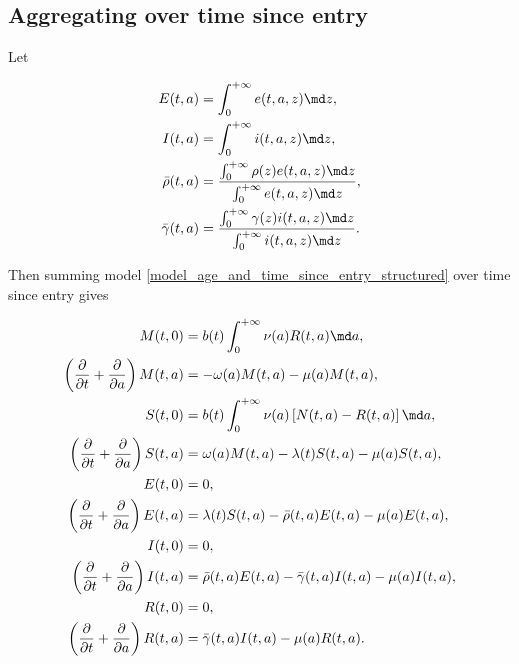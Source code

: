 \documentclass{jpmarticle}
\let\subequationsorig\subequations%
\let\endsubequationsorig\endsubequations%
\renewenvironment{subequations}{
  \subequationsorig
  \renewcommand{\theequation}{\theparentequation.\arabic{equation}}
}{
  \endsubequationsorig
}
\begin{document}
\subsection{Aggregating over time since entry}

Let
\begin{subequations}
  \begin{align}
    E(t, a)
    &= \int_0^{+\infty} e(t, a, z) \md z,
    \\
    I(t, a)
    &= \int_0^{+\infty} i(t, a, z) \md z,
    \\
    \bar{\rho}(t, a)
    &= \frac{\int_0^{+\infty} \rho(z) e(t, a, z) \md z}
      {\int_0^{+\infty} e(t, a, z) \md z},
    \\
    \bar{\gamma}(t, a)
    &= \frac{\int_0^{+\infty} \gamma(z) i(t, a, z) \md z}
      {\int_0^{+\infty} i(t, a, z) \md z}.
  \end{align}
\end{subequations}
Then summing model \eqref{model_age_and_time_since_entry_structured}
over time since entry gives
\begin{subequations}
  \label{model_age_and_time_since_entry_structured_agg_tse}
  \begin{align}
    M(t, 0) &=
    b(t) \int_0^{+\infty} \nu(a) R(t, a) \md a,
    \\
    \left(\frac{\partial}{\partial t}
      + \frac{\partial}{\partial a}\right)
    M(t, a) &=
    - \omega(a) M(t, a) - \mu(a) M(t, a),
    \\
    S(t, 0) &=
    b(t) \int_0^{+\infty} \nu(a) \left[N(t, a) - R(t, a)\right] \md a,
    \\
    \left(\frac{\partial}{\partial t}
      + \frac{\partial}{\partial a}\right)
    S(t, a) &=
    \omega(a) M(t, a) - \lambda(t) S(t, a) - \mu(a) S(t, a),
    \\
    E(t, 0) &= 0,
    \\
    \left(\frac{\partial}{\partial t}
      + \frac{\partial}{\partial a}\right)
    E(t, a)
    &= \lambda(t) S(t, a)
    - \bar{\rho}(t, a) E(t, a) - \mu(a) E(t, a),
    \\
    I(t, 0) &= 0,
    \\
    \left(\frac{\partial}{\partial t}
      + \frac{\partial}{\partial a}\right)
    I(t, a)
    &= \bar{\rho}(t, a) E(t, a)
    - \bar{\gamma}(t, a) I(t, a) - \mu(a) I(t, a),
    \\
    R(t, 0) &= 0,
    \\
    \left(\frac{\partial}{\partial t}
      + \frac{\partial}{\partial a}\right)
    R(t, a)
    &= \bar{\gamma}(t, a) I(t, a) - \mu(a) R(t, a).
  \end{align}
\end{subequations}
\end{document}
